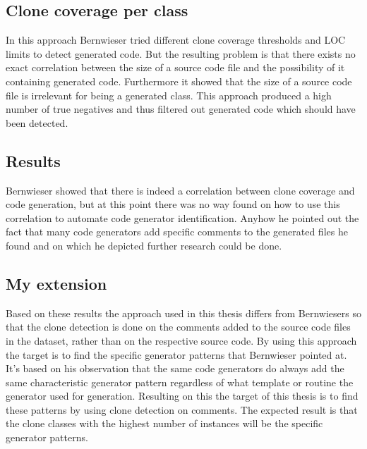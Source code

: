 \subsection{Clone coverage per class}
In this approach Bernwieser tried different clone coverage thresholds and LOC limits to detect generated code. But the resulting problem is that there exists no exact correlation between the size of a source code file and the possibility of it containing generated code. Furthermore it showed that the size of a source code file is irrelevant for being a generated class. This approach produced a high number of true negatives and thus filtered out generated code which should have been detected.
\subsection{Results}
Bernwieser showed that there is indeed a correlation between clone coverage and code generation, but at this point there was no way found on how to use this correlation to automate code generator identification. Anyhow he pointed out the fact that many code generators add specific comments to the generated files he found and on which he depicted further research could be done.
\subsection{My extension}
Based on these results the approach used in this thesis differs from Bernwiesers so that the clone detection is done on the comments added to the source code files in the dataset, rather than on the respective source code. By using this approach the target is to find the specific generator patterns that Bernwieser pointed at. It's based on his observation that the same code generators do always add the same characteristic generator pattern regardless of what template or routine the generator used for generation. Resulting on this the target of this thesis is to find these patterns by using clone detection on comments. The expected result is that the clone classes with the highest number of instances will be the specific generator patterns.

